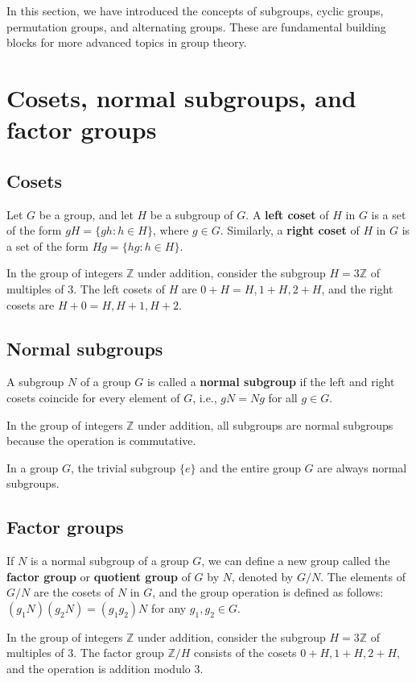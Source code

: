 In this section, we have introduced the concepts of subgroups, cyclic groups, permutation groups, and alternating groups. These are fundamental building blocks for more advanced topics in group theory.


\section{Cosets, normal subgroups, and factor groups}

\subsection{Cosets}
\begin{definition}
  Let $G$ be a group, and let $H$ be a subgroup of $G$. A \textbf{left coset} of $H$ in $G$ is a set of the form $gH = \{gh : h \in H\}$, where $g \in G$. Similarly, a \textbf{right coset} of $H$ in $G$ is a set of the form $Hg = \{hg : h \in H\}$.
\end{definition}

\begin{example}
  In the group of integers $\mathbb{Z}$ under addition, consider the subgroup $H = 3\mathbb{Z}$ of multiples of 3. The left cosets of $H$ are $0 + H = H, 1 + H, 2 + H$, and the right cosets are $H + 0 = H, H + 1, H + 2$.
\end{example}

\subsection{Normal subgroups}
\begin{definition}
  A subgroup $N$ of a group $G$ is called a \textbf{normal subgroup} if the left and right cosets coincide for every element of $G$, i.e., $gN = Ng$ for all $g \in G$.
\end{definition}

\begin{example}
  In the group of integers $\mathbb{Z}$ under addition, all subgroups are normal subgroups because the operation is commutative.
\end{example}

\begin{example}
  In a group $G$, the trivial subgroup $\{e\}$ and the entire group $G$ are always normal subgroups.
\end{example}

\subsection{Factor groups}
\begin{definition}
  If $N$ is a normal subgroup of a group $G$, we can define a new group called the \textbf{factor group} or \textbf{quotient group} of $G$ by $N$, denoted by $G/N$. The elements of $G/N$ are the cosets of $N$ in $G$, and the group operation is defined as follows: $(g_1N)(g_2N) = (g_1g_2)N$ for any $g_1, g_2 \in G$.
\end{definition}

\begin{example}
  In the group of integers $\mathbb{Z}$ under addition, consider the subgroup $H = 3\mathbb{Z}$ of multiples of 3. The factor group $\mathbb{Z}/H$ consists of the cosets $0 + H, 1 + H, 2 + H$, and the operation is addition modulo 3.
\end{example}


